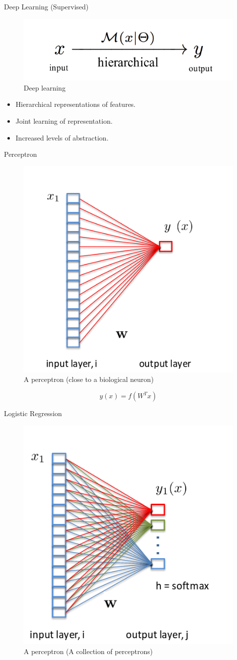 ﻿\documentclass[table,aspectratio=43,mathserif,xcolor={usenames,dvipsnames,svgnames,table},10pt]{beamer}
\begin{document}
\begin{frame}{Deep Learning (Supervised)}
 \begin{figure}[h]
    \includegraphics[width=0.9\linewidth]{images/dl.png}  
    \caption{Deep learning}
  \end{figure}
 \begin{itemize}
  \item<+-> Hierarchical representations of features.
  \item<+-> Joint learning of representation.
  \item<+-> Increased levels of abstraction.
 \end{itemize}
\end{frame}

\begin{frame}{Perceptron}
 \begin{figure}[h]
    \includegraphics[width=0.5\linewidth]{images/perceptron.png}  
    \caption{A perceptron (close to a biological neuron)}
  \end{figure}
  $$ y(x) = f( W^T x )$$
\end{frame}

\begin{frame}{Logistic Regression}
 \begin{figure}[h]
    \includegraphics[width=0.5\linewidth]{images/lr.png}  
    \caption{A perceptron (A collection of perceptrons)}
  \end{figure}
\end{frame}
\end{document}

